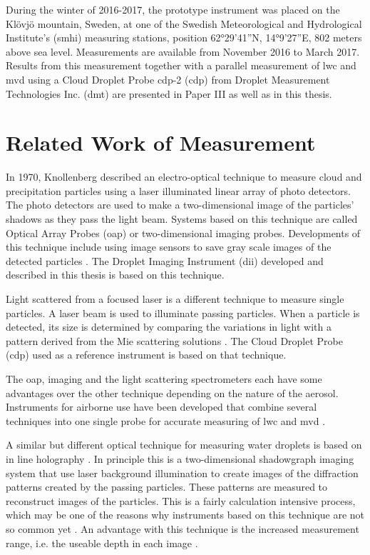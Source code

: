 During the winter of 2016-2017, the prototype instrument was placed on the Klövjö mountain, Sweden, at one of the Swedish Meteorological and Hydrological Institute's (\gls{smhi}) measuring stations, position 62°29'41''N, 14°9'27''E, 802 meters above sea level. Measurements are available from November 2016 to March 2017. Results from this measurement together with a parallel measurement of \gls{lwc} and \gls{mvd} using a Cloud Droplet Probe \gls{cdp}-2 (\gls{cdp}) from Droplet Measurement Technologies Inc. (\gls{dmt}) are presented in Paper III as well as in this thesis.

\section{Related Work of Measurement}
\label{sec:relwork}
In 1970, Knollenberg \cite{knoll1970} described an electro-optical technique to measure cloud and precipitation particles using a laser illuminated linear array of photo detectors. The photo detectors are used to make a two-dimensional image of the particles’ shadows as they pass the light beam. Systems based on this technique are called Optical Array Probes (\gls{oap}) or two-dimensional imaging probes. Developments of this technique include using image sensors to save gray scale images of the detected particles \cite{kulk2011,wend2013}. The Droplet Imaging Instrument (\gls{dii}) developed and described in this thesis is based on this technique.

Light scattered from a focused laser \cite{baum1983,dye1984} is a different technique to measure single particles. A laser beam is used to illuminate passing particles. When a particle is detected, its size is determined by comparing the variations in light with a pattern derived from the Mie scattering solutions \cite{mie1908}. The Cloud Droplet Probe (\gls{cdp}) used as a reference instrument is based on that technique.

The \gls{oap}, imaging and the light scattering spectrometers each have some advantages over the other technique depending on the nature of the aerosol. Instruments for airborne use have been developed that combine several techniques into one single probe for accurate measuring of \gls{lwc} and \gls{mvd} \cite{baum2001, baum2011}.

A similar but different optical technique for measuring water droplets is based on in line holography \cite{laws1995}. In principle this is a two-dimensional shadowgraph imaging system that use laser background illumination to create images of the diffraction patterns created by the passing particles. These patterns are measured to reconstruct images of the particles. This is a fairly calculation intensive process, which may be one of the reasons why instruments based on this technique are not so common yet \cite{henn2013}. An advantage with this technique is the increased measurement range, i.e. the useable depth in each image \cite{kaikk2014}.

